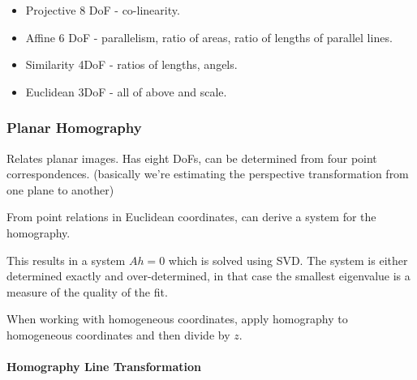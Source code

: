 \begin{itemize}
\item Projective 8 DoF - co-linearity.
\item Affine 6 DoF - parallelism, ratio of areas, ratio of lengths of parallel lines.
\item Similarity 4DoF - ratios of lengths, angels.
\item Euclidean 3DoF - all of above and scale.
\end{itemize}



\subsubsection{Planar Homography}

Relates planar images. Has eight DoFs, can be determined from four point correspondences.
(basically we're estimating the perspective transformation from one plane to another)

From point relations in Euclidean coordinates, can derive a system for the homography. 

This results in a system $Ah = 0$ which is solved using SVD. 
The system is either determined exactly and over-determined, in that case the smallest eigenvalue is a measure of the quality of the fit.

When working with homogeneous coordinates, apply homography to homogeneous coordinates and then divide by $z$.




\paragraph{Homography Line Transformation}

